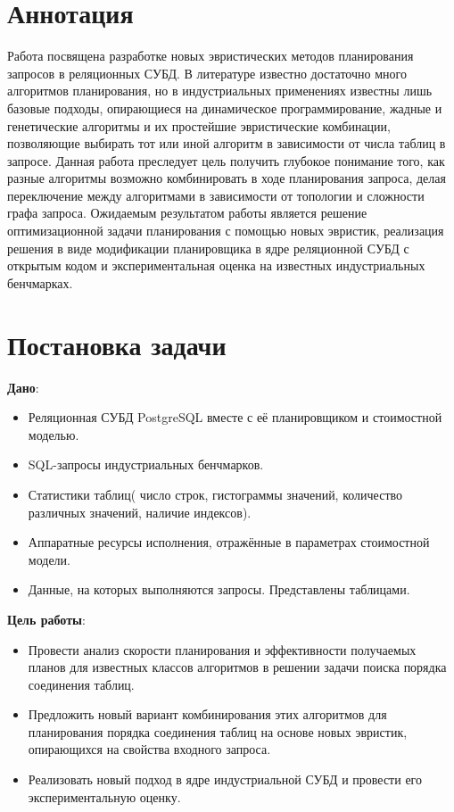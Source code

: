 
\section*{Аннотация}

Работа посвящена разработке новых эвристических методов планирования запросов в реляционных СУБД. В литературе известно достаточно много алгоритмов планирования, 
но в индустриальных применениях известны лишь базовые подходы, опирающиеся на динамическое программирование, жадные и генетические алгоритмы и их простейшие 
эвристические комбинации, позволяющие выбирать тот или иной алгоритм в зависимости от числа таблиц в запросе. Данная работа преследует цель получить глубокое понимание 
того, как разные алгоритмы возможно комбинировать в ходе планирования запроса, делая переключение между алгоритмами в зависимости от топологии и сложности графа запроса. Ожидаемым результатом работы является решение оптимизационной задачи планирования с помощью новых эвристик, реализация решения в 
виде модификации планировщика в ядре реляционной СУБД с открытым кодом и экспериментальная оценка на известных индустриальных бенчмарках.


\section*{Постановка задачи}
\textbf{Дано}:
\begin{itemize}
    \item Реляционная СУБД PostgreSQL вместе с её планировщиком и стоимостной моделью.
    \item SQL-запросы индустриальных бенчмарков.
    \item Статистики таблиц( число строк, гистограммы значений, количество различных значений, наличие индексов).
    \item Аппаратные ресурсы исполнения, отражённые в параметрах стоимостной модели.
    \item Данные, на которых выполняются запросы. Представлены таблицами.
\end{itemize}

\textbf{Цель работы}:
\begin{itemize}
    \item Провести анализ скорости планирования и эффективности получаемых планов для известных классов алгоритмов
    в решении задачи поиска порядка соединения таблиц.
    \item Предложить новый вариант комбинирования этих алгоритмов для планирования порядка соединения таблиц на основе 
    новых эвристик, опирающихся на свойства входного запроса.
    \item Реализовать новый подход в ядре индустриальной СУБД и провести его экспериментальную оценку.
\end{itemize}